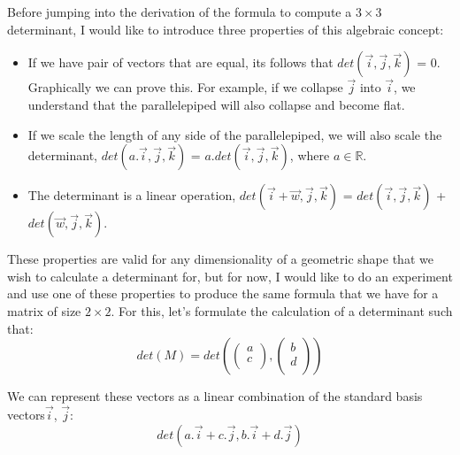 \documentclass[600paper, 11pt,twoside,openany]{kdp}
\begin{document}
\indent Before jumping into the derivation of the formula to compute a $3 \times 3$ determinant, I would like to introduce three properties of this algebraic concept:
\begin{tcolorbox}
\begin{itemize}
\item If we have pair of vectors that are equal, its follows that  $det(\overrightarrow{i}, \overrightarrow{j}, \overrightarrow{k})$ = 0. Graphically we can prove this. For example, if we collapse $\overrightarrow{j}$ into $\overrightarrow{i}$, we understand that the parallelepiped will also collapse and become flat.
\item If we scale the length of any side of the parallelepiped, we will also scale the determinant, $det(a.\overrightarrow{i}, \overrightarrow{j}, \overrightarrow{k})$ = $a.det(\overrightarrow{i}, \overrightarrow{j}, \overrightarrow{k})$, where $a \in \mathbb{R}$.
\item The determinant is a linear operation, $det(\overrightarrow{i} + \overrightarrow{w}, \overrightarrow{j}, \overrightarrow{k})$ =  $det(\overrightarrow{i}, \overrightarrow{j}, \overrightarrow{k})$ + $det(\overrightarrow{w}, \overrightarrow{j}, \overrightarrow{k})$.
\end{itemize}
\end{tcolorbox}
These properties are valid for any dimensionality of a geometric shape that we wish to calculate a determinant for, but for now, I would like to do an experiment and use one of these properties to produce the same formula that we have for a matrix of size $2 \times 2$. For this, let’s formulate the calculation of a determinant such that:
\[det(M) = det \left(\begin{pmatrix}
a\\
c\\
\end{pmatrix},\begin{pmatrix}
b\\
d\\
\end{pmatrix} \right)\]
\par 
\vspace{-3pt}
\indent We can represent these vectors as a linear combination of the standard basis vectors$\overrightarrow{i}$, $\overrightarrow{j}$:
\begin{equation}\label{eq:deteq}
det(a.\overrightarrow{i} + c.\overrightarrow{j},  b.\overrightarrow{i} + d.\overrightarrow{j})
\end{equation}
\par 
\end{document}
